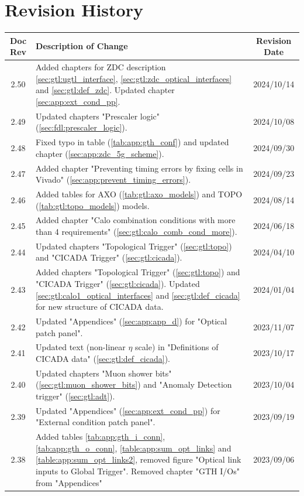 \section*{Revision History}
\label{sec:revision_history}

\begin{longtable}{|c|p{}|c|}
\hline
Doc Rev & Description of Change & Revision Date\\
\hline
\hline
\endhead
2.50 & Added chapters for ZDC description \ref{sec:gtl:ugtl_interface}, \ref{sec:gtl:zdc_optical_interfaces} and \ref{sec:gtl:def_zdc}. Updated chapter \ref{sec:app:ext_cond_pp}. & 2024/10/14\\
2.49 & Updated chapters "Prescaler logic" (\ref{sec:fdl:prescaler_logic}). & 2024/10/08\\
2.48 & Fixed typo in table (\ref{tab:app:gth_conf}) and updated chapter (\ref{sec:app:zdc_5g_scheme}). & 2024/09/30\\
2.47 & Added chapter "Preventing timing errors by fixing cells in Vivado" (\ref{sec:app:prevent_timing_errors}). & 2024/09/23\\
2.46 & Added tables for AXO (\ref{tab:gtl:axo_models}) and TOPO (\ref{tab:gtl:topo_models}) models. & 2024/08/14\\
2.45 & Added chapter "Calo combination conditions with more than 4 requirements" (\ref{sec:gtl:calo_comb_cond_more}). & 2024/06/18\\
2.44 & Updated chapters "Topological Trigger" (\ref{sec:gtl:topo}) and "CICADA Trigger" (\ref{sec:gtl:cicada}). & 2024/04/10\\
2.43 & Added chapters "Topological Trigger" (\ref{sec:gtl:topo}) and "CICADA Trigger" (\ref{sec:gtl:cicada}). Updated \ref{sec:gtl:calo1_optical_interfaces} and \ref{sec:gtl:def_cicada} for new structure of CICADA data. & 2024/01/04\\
2.42 & Updated "Appendices" (\ref{sec:app:app_d}) for "Optical patch panel". & 2023/11/07\\
2.41 & Updated text (non-linear $\eta$ scale) in "Definitions of CICADA data" (\ref{sec:gtl:def_cicada}). & 2023/10/17\\
2.40 & Updated chapters "Muon shower bits" (\ref{sec:gtl:muon_shower_bits}) and "Anomaly Detection trigger" (\ref{sec:gtl:adt}). & 2023/10/04\\
2.39 & Updated "Appendices" (\ref{sec:app:ext_cond_pp}) for "External condition patch panel". & 2023/09/19\\
2.38 & Added tables \ref{tab:app:gth_i_conn}, \ref{tab:app:gth_o_conn}, \ref{table:app:sum_opt_links} and \ref{table:app:sum_opt_links2}, removed figure "Optical link inputs to Global Trigger". Removed chapter "GTH I/Os" from "Appendices" & 2023/09/06\\

\end{longtable}
